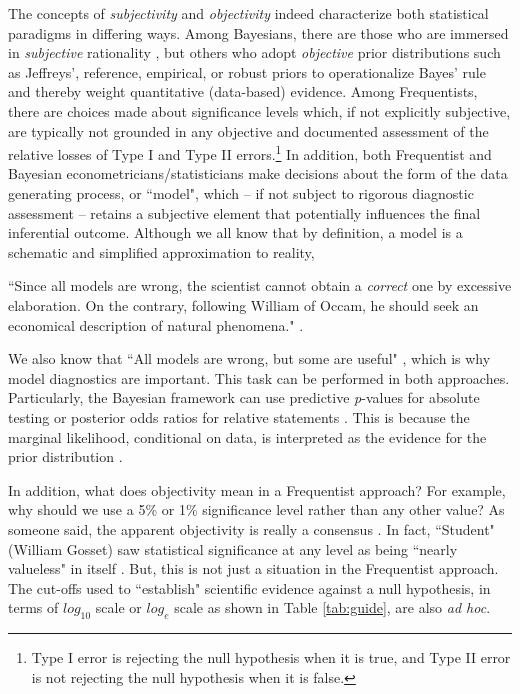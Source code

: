 The concepts of \textit{subjectivity} and \textit{objectivity} indeed characterize both statistical paradigms in differing ways. Among Bayesians, there are those who are immersed in \textit{subjective} rationality \cite{Ramsey1926, deFinetti1937, savage1954, Lindley2000}, but others who adopt \textit{objective} prior distributions such as Jeffreys', reference, empirical, or robust priors \cite{Bayes1763, Laplace1812, Jeffreys1961, Berger2006} to operationalize Bayes' rule and thereby weight quantitative (data-based) evidence. Among Frequentists, there are choices made about significance levels which, if not explicitly subjective, are typically not grounded in any objective and documented assessment of the relative losses of Type I and Type II errors.\footnote{Type I error is rejecting the null hypothesis when it is true, and Type II error is not rejecting the null hypothesis when it is false.} In addition, both Frequentist and Bayesian econometricians/statisticians make decisions about the form of the data generating process, or ``model", which -- if not subject to rigorous diagnostic assessment -- retains a subjective element that potentially influences the final inferential outcome. Although we all know that by definition, a model is a schematic and simplified approximation to reality,

``Since all models are wrong, the scientist cannot obtain a \textit{correct} one by excessive elaboration. On the contrary, following William of Occam, he should seek an economical description of natural phenomena." \cite{Box1976}.

We also know that ``All models are wrong, but some are useful" \cite{box1979robustness}, which is why model diagnostics are important. This task can be performed in both approaches. Particularly, the Bayesian framework can use predictive \textit{p}-values for absolute testing \cite{Gelman1996, Bayarri2000} or posterior odds ratios for relative statements \cite{Jeffreys1935, Kass1995}. This is because the marginal likelihood, conditional on data, is interpreted as the evidence for the prior distribution \cite{berger93}.

In addition, what does objectivity mean in a Frequentist approach? For example, why should we use a 5\% or 1\% significance level rather than any other value? As someone said, the apparent objectivity is really a consensus \cite{Lindley2000}. In fact, ``Student" (William Gosset) saw statistical significance at any level as being ``nearly valueless" in itself \cite{Ziliak2008}. But, this is not just a situation in the Frequentist approach. The cut-offs used to ``establish" scientific evidence against a null hypothesis, in terms of $log_{10}$ scale \cite{Jeffreys1961} or $log_{e}$ scale \cite{Kass1995} as shown in Table \ref{tab:guide}, are also \textit{ad hoc}.

